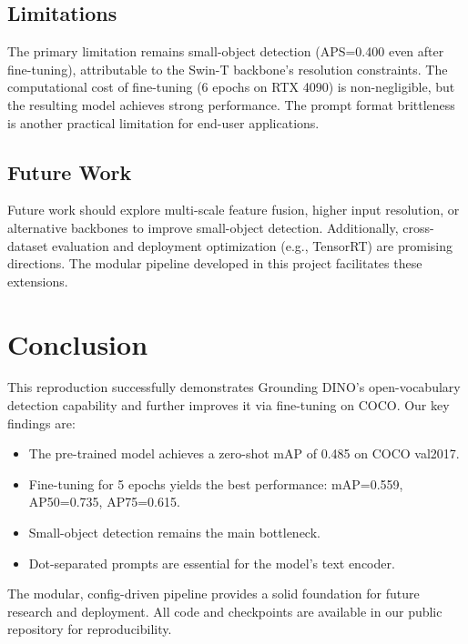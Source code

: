 \documentclass[10pt,journal,final,twocolumn]{IEEEtran}
\begin{document}
\subsection{Limitations}

The primary limitation remains small-object detection (APS=0.400 even after fine-tuning), attributable to the Swin-T backbone's resolution constraints. The computational cost of fine-tuning (6 epochs on RTX 4090) is non-negligible, but the resulting model achieves strong performance. The prompt format brittleness is another practical limitation for end-user applications.

\subsection{Future Work}

Future work should explore multi-scale feature fusion, higher input resolution, or alternative backbones to improve small-object detection. Additionally, cross-dataset evaluation and deployment optimization (e.g., TensorRT) are promising directions. The modular pipeline developed in this project facilitates these extensions.

\section{Conclusion}

This reproduction successfully demonstrates Grounding DINO's open-vocabulary detection capability and further improves it via fine-tuning on COCO. Our key findings are:
\begin{itemize}
    \item The pre-trained model achieves a zero-shot mAP of 0.485 on COCO val2017.
    \item Fine-tuning for 5 epochs yields the best performance: mAP=0.559, AP50=0.735, AP75=0.615.
    \item Small-object detection remains the main bottleneck.
    \item Dot-separated prompts are essential for the model's text encoder.
\end{itemize}
The modular, config-driven pipeline provides a solid foundation for future research and deployment. All code and checkpoints are available in our public repository for reproducibility.

\end{document}
